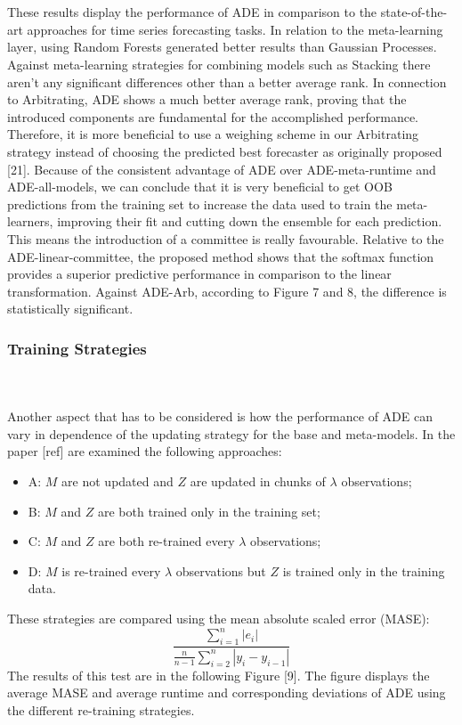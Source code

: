 \documentclass[runningheads,a4paper]{llncs}[2015/06/24]
\begin{document}
\hspace{1cm}\\\\ These results display the performance of ADE in comparison to the state-of-the-art approaches for time series forecasting tasks. In relation to the meta-learning layer, using Random Forests generated better results than Gaussian Processes. Against meta-learning strategies for combining models such as Stacking there aren't any significant differences other than a better average rank. In connection to Arbitrating, ADE shows a much better average rank, proving that the introduced components are fundamental for the accomplished performance. Therefore, it is more beneficial to use a weighing scheme in our Arbitrating strategy instead of choosing the predicted best forecaster as originally proposed [21]. Because of the consistent advantage of ADE over ADE-meta-runtime and ADE-all-models, we can conclude that it is very beneficial to get OOB predictions from the training set to increase the data used to train the meta-learners, improving their fit and cutting down the ensemble for each prediction. This means the introduction of a committee is really favourable. Relative to the ADE-linear-committee, the proposed method shows that the softmax function provides a superior predictive performance in comparison to the linear transformation. Against ADE-Arb, according to Figure 7 and 8, the difference is statistically significant. 

\subsubsection{Training Strategies}
\hspace{1cm}\\\\ Another aspect that has to be considered is how the performance of ADE can vary in dependence of the updating strategy for the base and meta-models. In the paper [ref] are examined the following approaches:
\begin{itemize}
\item A: $M$ are not updated and $Z$ are updated in chunks of $\lambda$ observations;
\item B: $M$ and $Z$ are both trained only in the training set;
\item C: $M$ and $Z$ are both re-trained every $\lambda$ observations;
\item D: $M$ is re-trained every $\lambda$ observations but $Z$ is trained only in the training data.
\end{itemize}
These strategies are compared using the mean absolute scaled error (MASE):
\begin{equation}
\frac{\sum^n_{i=1}|e_i|}{\frac{n}{n-1} \sum^n_{i=2}|y_i-y_{i-1}|}
\end{equation}
The results of this test are in the following Figure [9]. The figure displays the average MASE and average runtime and corresponding deviations of ADE using the different re-training strategies.
\end{document}
